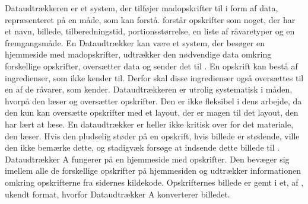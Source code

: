 {Dataudtrækkeren er et system, der tilføjer madopskrifter til \Foodl{} i form af data, repræsenteret på en måde, som \Foodl{} kan forstå. \Foodl{} forstår opskrifter som noget, der har et navn, billede, tilberedningstid, portionsstørrelse, en liste af råvaretyper og en fremgangsmåde. En Dataudtrækker kan \fx være et system, der besøger en hjemmeside med madopskrifter, udtrækker den nødvendige data omkring forskellige opskrifter, oversætter data og sender det til \Foodl{}. En opskrift kan bestå af ingredienser, som \Foodl{} ikke kender til. Derfor skal disse ingredienser også oversættes til en af de råvarer, som \Foodl{} kender.}
{Dataudtrækkeren er utrolig systematisk i måden, hvorpå den læser og oversætter opskrifter. Den er ikke fleksibel i dens arbejde, da den kun kan oversætte opskrifter med et layout, der er magen til det layout, den har lært at læse. En dataudtrækker er heller ikke kritisk over for det materiale, den læser. Hvis den pludselig støder på en opskrift, hvis billede er stødende, ville den ikke bemærke dette, og stadigvæk forsøge at indsende dette billede til \Foodl{}.}
{Dataudtrækker A fungerer på en hjemmeside med opskrifter. Den bevæger sig imellem alle de forskellige opskrifter på hjemmesiden og udtrækker informationen omkring opskrifterne fra sidernes kildekode. Opskrifternes billede er gemt i et, af \Foodl, ukendt format, hvorfor Dataudtrækker A konverterer billedet.}